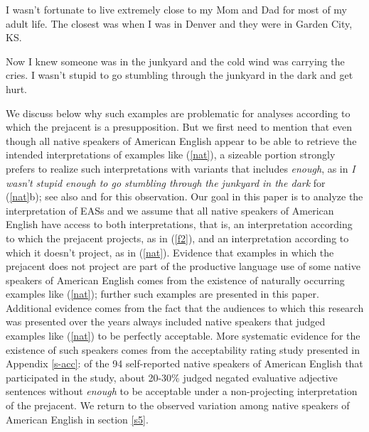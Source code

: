 \documentclass[11pt,fleqn]{article}
\newcommand{\6}{\mbox{$[\hspace*{-.6mm}[$}}
\newcommand{\9}{\mbox{$]\hspace*{-.6mm}]$}}
\begin{document}
\begin{exe}
\ex\label{nat} \citealt[235]{karttunen-etal2014}
\begin{xlist}
\ex I wasn't fortunate to live extremely close to my Mom and Dad for most of my adult life. The closest was when I was in Denver and they were in Garden City, KS.


\ex  Now I knew someone was in the junkyard and the cold wind was
carrying the cries. I wasn't stupid to go stumbling through the
junkyard in the dark and get hurt.

\end{xlist} \end{exe} 

We discuss below why such examples are problematic for analyses according to which the prejacent is a presupposition. But we first need to mention that even though all native speakers of American English appear to be able to retrieve the intended interpretations of examples like (\ref{nat}), a sizeable portion strongly prefers to realize such interpretations with variants that includes {\em enough}, as in {\em I wasn't stupid enough to go stumbling through the junkyard in the dark} for (\ref{nat}b); see also \citealt{karttunen2013} and \citealt{karttunen-etal2014} for this observation. Our goal in this paper is to analyze the interpretation of EASs and we assume that all native speakers of American English have access to both interpretations, that is, an interpretation according to which the prejacent projects, as in (\ref{f2}), and an interpretation according to which it doesn't project, as in (\ref{nat}). Evidence that examples in which the prejacent does not project are part of the productive language use of some native speakers of American English comes from the existence of naturally occurring examples like (\ref{nat}); further  such examples are presented in this paper. Additional evidence comes from the fact that the audiences to which this research was presented over the years always included native speakers that judged examples like (\ref{nat}) to be perfectly acceptable. More systematic evidence for the existence of such speakers comes from the acceptability rating study presented in Appendix \ref{s-acc}: of the 94 self-reported native speakers of American English that participated in the study, about 20-30\% judged negated evaluative adjective sentences without {\em enough} to be acceptable under a non-projecting interpretation of the prejacent. We return to the observed variation among native speakers of American English in section \ref{s5}.
\end{document}
